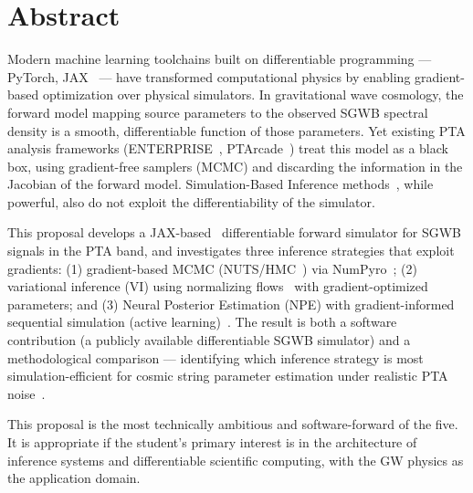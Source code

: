 \section{Abstract}\label{sec:5-abstract}
Modern machine learning toolchains built on differentiable programming — PyTorch, JAX~\cite{bradbury_jax_2018} — have transformed computational physics by enabling gradient-based optimization over physical simulators.
In gravitational wave cosmology, the forward model mapping source parameters to the observed SGWB spectral density is a smooth, differentiable function of those parameters.
Yet existing PTA analysis frameworks (ENTERPRISE~\cite{ellis_enterprise_2020}, PTArcade~\cite{mitridate_ptarcade_2023a}) treat this model as a black box, using gradient-free samplers (MCMC) and discarding the information in the Jacobian of the forward model.
Simulation-Based Inference methods~\cite{cranmer_frontier_2020}, while powerful, also do not exploit the differentiability of the simulator.

This proposal develops a JAX-based~\cite{bradbury_jax_2018} differentiable forward simulator for SGWB signals in the PTA band, and investigates three inference strategies that exploit gradients: (1) gradient-based MCMC (NUTS/HMC~\cite{hoffman_nuts_2014}) via NumPyro~\cite{phan_composable_2019}; (2) variational inference (VI) using normalizing flows~\cite{papamakarios_normalizing_2021} with gradient-optimized parameters; and (3) Neural Posterior Estimation (NPE) with gradient-informed sequential simulation (active learning)~\cite{cranmer_frontier_2020}.
The result is both a software contribution (a publicly available differentiable SGWB simulator) and a methodological comparison — identifying which inference strategy is most simulation-efficient for cosmic string parameter estimation under realistic PTA noise~\cite{afzal_nanograv_2023}.

This proposal is the most technically ambitious and software-forward of the five.
It is appropriate if the student's primary interest is in the architecture of inference systems and differentiable scientific computing, with the GW physics as the application domain.


